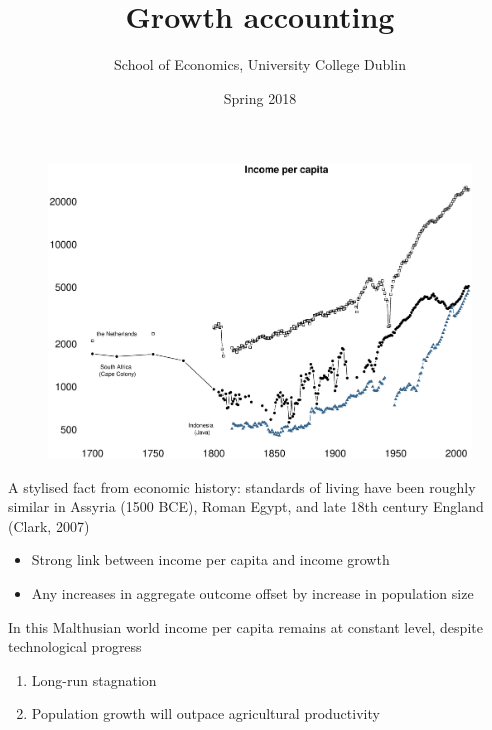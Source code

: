 \documentclass{beamer}
\title{Growth accounting}
\author{School of Economics, University College Dublin}
\date{Spring 2018}
\begin{document}
\begin{frame}
 \titlepage
\end{frame}

\begin{frame}
  \begin{figure}
    \includegraphics[scale=.3]{historic_income.eps}
  \end{figure}
\end{frame}

\begin{frame}
  A stylised fact from economic history: standards of living have been roughly similar in Assyria (1500 BCE), Roman Egypt, and late 18th century England (Clark, 2007)
  \begin{itemize}
    \item Strong link between income per capita and income growth
    \item Any increases in aggregate outcome offset by increase in population size
  \end{itemize}
  \medskip
  In this Malthusian world income per capita remains at constant level, despite technological progress
  \begin{enumerate}
    \item Long-run stagnation
    \item Population growth will outpace agricultural productivity
  \end{enumerate}
\end{frame}
\end{document}
